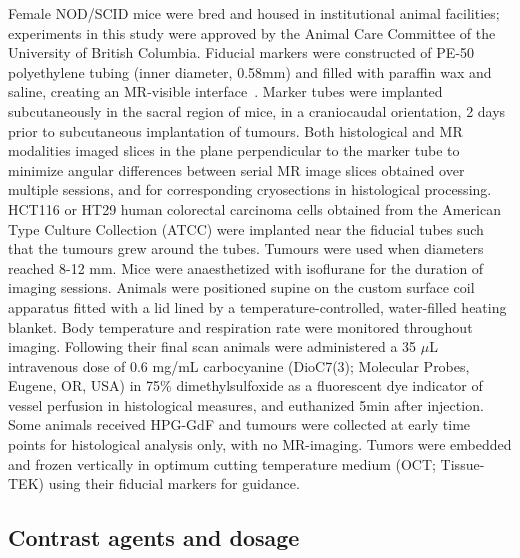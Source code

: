 Female NOD/SCID mice were bred and housed in institutional animal facilities; experiments in this study were approved by the Animal Care Committee of the University of British Columbia.
Fiducial markers were constructed of PE-50 polyethylene tubing (inner diameter, 0.58mm) and filled with paraffin wax and saline, creating an MR-visible interface~\cite{Bains:2009hh}.
Marker tubes were implanted subcutaneously in the sacral region of mice, in a craniocaudal orientation, 2 days prior to subcutaneous implantation of tumours.
Both histological and MR modalities imaged slices in the plane perpendicular to the marker tube to minimize angular differences between serial MR image slices obtained over multiple sessions, and for corresponding cryosections in histological processing.
HCT116 or HT29 human colorectal carcinoma cells obtained from the American Type Culture Collection (ATCC) were implanted near the fiducial tubes such that the tumours grew around the tubes.
Tumours were used when diameters reached 8-12 mm.
Mice were anaesthetized with isoflurane for the duration of imaging sessions.
Animals were positioned supine on the custom surface coil apparatus fitted with a lid lined by a temperature-controlled, water-filled heating blanket.
Body temperature and respiration rate were monitored throughout imaging.
Following their final scan animals were administered a 35 $\mu$L intravenous dose of 0.6 mg/mL carbocyanine (DioC7(3); Molecular Probes, Eugene, OR, USA) in 75\% dimethylsulfoxide as a fluorescent dye indicator of vessel perfusion in histological measures, and euthanized 5min after injection.
Some animals received \acs{HPG-GdF} and tumours were collected at early time points for histological analysis only, with no MR-imaging.
Tumors were embedded and frozen vertically in optimum cutting temperature medium (OCT; Tissue-TEK) using their fiducial markers for guidance.

\subsection{Contrast agents and dosage}

